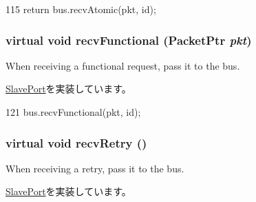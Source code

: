 \begin{DoxyCode}
115         { return bus.recvAtomic(pkt, id); }
\end{DoxyCode}
\hypertarget{classNoncoherentBus_1_1NoncoherentBusSlavePort_a914924599c231593833dd1d527b4bb7c}{
\subsubsection[{recvFunctional}]{\setlength{\rightskip}{0pt plus 5cm}virtual void recvFunctional ({\bf PacketPtr} {\em pkt})}}
\label{classNoncoherentBus_1_1NoncoherentBusSlavePort_a914924599c231593833dd1d527b4bb7c}
When receiving a functional request, pass it to the bus. 

\hyperlink{classSlavePort_a6a3d6f2e5dab6bed16d53d9e7c17378d}{SlavePort}を実装しています。


\begin{DoxyCode}
121         { bus.recvFunctional(pkt, id); }
\end{DoxyCode}
\hypertarget{classNoncoherentBus_1_1NoncoherentBusSlavePort_a7ec461ad187b82b4b21e27c86e45cf9c}{
\subsubsection[{recvRetry}]{\setlength{\rightskip}{0pt plus 5cm}virtual void recvRetry ()}}
\label{classNoncoherentBus_1_1NoncoherentBusSlavePort_a7ec461ad187b82b4b21e27c86e45cf9c}
When receiving a retry, pass it to the bus. 

\hyperlink{classSlavePort_ac1ccc3bcf7ebabb20b57fab99b2be5b0}{SlavePort}を実装しています。


